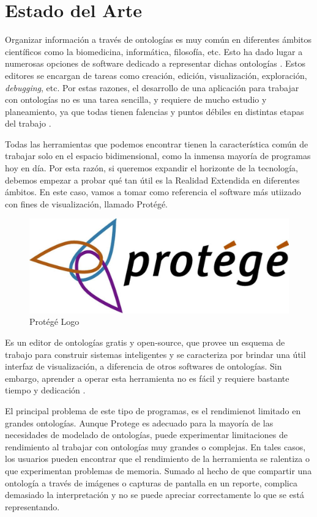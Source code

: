\clearemptydoublepage
\chapter{Estado del Arte}

Organizar información a través de ontologías es muy común en diferentes ámbitos científicos como la biomedicina, informática, filosofía, etc.
Esto ha dado lugar a numerosas opciones de software dedicado a representar dichas ontologías \cite[]{ontologyEditors}. Estos editores se encargan de tareas como creación,
edición, visualización, exploración, \textit{debugging}, etc. Por estas razones, el desarrollo de una aplicación para trabajar con ontologías no es
una tarea sencilla, y requiere de mucho estudio y planeamiento, ya que todas tienen falencias y puntos débiles en distintas etapas del trabajo \cite[]{ontologyIssues}.

Todas las herramientas que podemos encontrar tienen la característica común de trabajar solo en el espacio bidimensional, como la inmensa mayoría de programas hoy en día.
Por esta razón, si queremos expandir el horizonte de la tecnología, debemos empezar a probar qué tan útil es la Realidad Extendida en diferentes ámbitos. En este caso,
vamos a tomar como referencia el software más utiizado con fines de visualización, llamado Protégé.

\begin{figure}[ht]
   \begin{center}
      \includegraphics[width=0.7\linewidth]{chapter1/figures/protege.jpg}
   \end{center}
   \caption[Protégé Logo]
   {\footnotesize Protégé Logo}
   \label{fig:mufigure3}
\end{figure}

Es un editor de ontologías gratis y open-source, que provee un esquema de trabajo para construir sistemas inteligentes y se caracteriza
por brindar una útil interfaz de visualización, a diferencia de otros softwares de ontologías. Sin embargo, aprender a operar esta herramienta no es fácil
y requiere bastante tiempo y dedicación \cite[]{ontologyTutorial}.

El principal problema de este tipo de programas, es el rendimienot limitado en grandes ontologías. Aunque Protege es adecuado para la mayoría de las necesidades de modelado de ontologías, puede experimentar limitaciones de rendimiento al trabajar con ontologías muy grandes o complejas. En tales casos, los usuarios pueden encontrar que el rendimiento de la herramienta se ralentiza o que experimentan problemas de memoria.
Sumado al hecho de que compartir una ontología a través de imágenes o capturas de pantalla en un reporte, complica demasiado la interpretación y no se puede apreciar correctamente lo que se está representando.